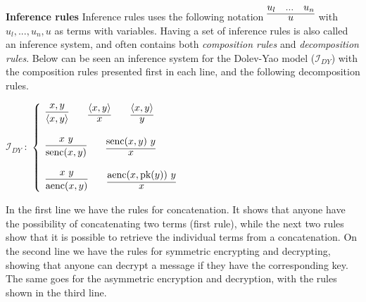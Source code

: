 \noindent \textbf{Inference rules}  \qquad
Inference rules uses the following notation $\infer{u} {u_l & ... & u_n}$ with $u_l,...,u_n, u$ as terms with variables. Having a set of inference rules is also called an inference system, and often contains both \textit{composition rules} and \textit{decomposition rules}. Below can be seen an inference system for the Dolev-Yao model ($\mathcal{I}_{DY}$) with the composition rules presented first in each line, and the following decomposition rules. 
\begin{center}
$\mathcal{I}_{DY}\ :$
\begin{math}
  \left\{
    \begin{array}{l l l}
      \infer{\langle x, y \rangle}{x,y} \qquad \infer{x}{\langle x, y \rangle} \qquad \infer{y}{\langle x, y \rangle} \\ \\
      \infer{\text{senc}(x, y)}{x\ y} \qquad  \infer{x}{\text{senc}(x, y)\ y} \\ \\
      \infer{\text{aenc}(x, y)}{x\ y} \qquad \infer{x}{\text{aenc}(x, \text{pk}(y))\ y}
    \end{array}
  \right.
\end{math}
\end{center}
\bigbreak
\noindent In the first line we have the rules for concatenation. It shows that anyone have the possibility of concatenating two terms (first rule), while the next two rules show that it is possible to retrieve the individual terms from a concatenation. 
On the second line we have the rules for symmetric encrypting and decrypting, showing that anyone can decrypt a message if they have the corresponding key. The same goes for the asymmetric encryption and decryption, with the rules shown in the third line. \\

